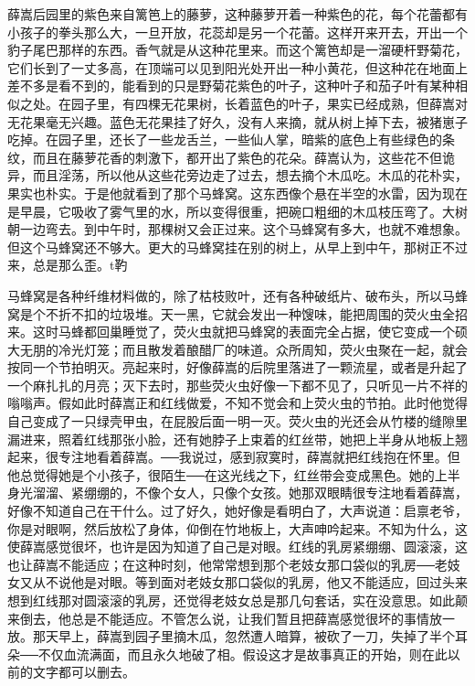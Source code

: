 薛嵩后园里的紫色来自篱笆上的藤萝，这种藤萝开着一种紫色的花，每个花蕾都有小孩子的拳头那么大，一旦开放，花蕊却是另一个花蕾。这样开来开去，开出一个豹子尾巴那样的东西。香气就是从这种花里来。而这个篱笆却是一溜硬杆野菊花，它们长到了一丈多高，在顶端可以见到阳光处开出一种小黄花，但这种花在地面上差不多是看不到的，能看到的只是野菊花紫色的叶子，这种叶子和茄子叶有某种相似之处。在园子里，有四棵无花果树，长着蓝色的叶子，果实已经成熟，但薛嵩对无花果毫无兴趣。蓝色无花果挂了好久，没有人来摘，就从树上掉下去，被猪崽子吃掉。在园子里，还长了一些龙舌兰，一些仙人掌，暗紫的底色上有些绿色的条纹，而且在藤萝花香的刺激下，都开出了紫色的花朵。薛嵩认为，这些花不但诡异，而且淫荡，所以他从这些花旁边走了过去，想去摘个木瓜吃。木瓜的花朴实，果实也朴实。于是他就看到了那个马蜂窝。这东西像个悬在半空的水雷，因为现在是早晨，它吸收了雾气里的水，所以变得很重，把碗口粗细的木瓜枝压弯了。大树朝一边弯去。到中午时，那棵树又会正过来。这个马蜂窝有多大，也就不难想象。但这个马蜂窝还不够大。更大的马蜂窝挂在别的树上，从早上到中午，那树正不过来，总是那么歪。t靮 

马蜂窝是各种纤维材料做的，除了枯枝败叶，还有各种破纸片、破布头，所以马蜂窝是个不折不扣的垃圾堆。天一黑，它就会发出一种馊味，能把周围的荧火虫全招来。这时马蜂都回巢睡觉了，荧火虫就把马蜂窝的表面完全占据，使它变成一个硕大无朋的冷光灯笼；而且散发着酿醋厂的味道。众所周知，荧火虫聚在一起，就会按同一个节拍明灭。亮起来时，好像薛嵩的后院里落进了一颗流星，或者是升起了一个麻扎扎的月亮；灭下去时，那些荧火虫好像一下都不见了，只听见一片不祥的嗡嗡声。假如此时薛嵩正和红线做爱，不知不觉会和上荧火虫的节拍。此时他觉得自己变成了一只绿壳甲虫，在屁股后面一明一灭。荧火虫的光还会从竹楼的缝隙里漏进来，照着红线那张小脸，还有她脖子上束着的红丝带，她把上半身从地板上翘起来，很专注地看着薛嵩。──我说过，感到寂寞时，薛嵩就把红线抱在怀里。但他总觉得她是个小孩子，很陌生──在这光线之下，红丝带会变成黑色。她的上半身光溜溜、紧绷绷的，不像个女人，只像个女孩。她那双眼睛很专注地看着薛嵩，好像不知道自己在干什么。过了好久，她好像是看明白了，大声说道：启禀老爷，你是对眼啊，然后放松了身体，仰倒在竹地板上，大声呻吟起来。不知为什么，这使薛嵩感觉很坏，也许是因为知道了自己是对眼。红线的乳房紧绷绷、圆滚滚，这也让薛嵩不能适应；在这种时刻，他常常想到那个老妓女那口袋似的乳房──老妓女又从不说他是对眼。等到面对老妓女那口袋似的乳房，他又不能适应，回过头来想到红线那对圆滚滚的乳房，还觉得老妓女总是那几句套话，实在没意思。如此颠来倒去，他总是不能适应。不管怎么说，让我们暂且把薛嵩感觉很坏的事情放一放。那天早上，薛嵩到园子里摘木瓜，忽然遭人暗算，被砍了一刀，失掉了半个耳朵──不仅血流满面，而且永久地破了相。假设这才是故事真正的开始，则在此以前的文字都可以删去。 

